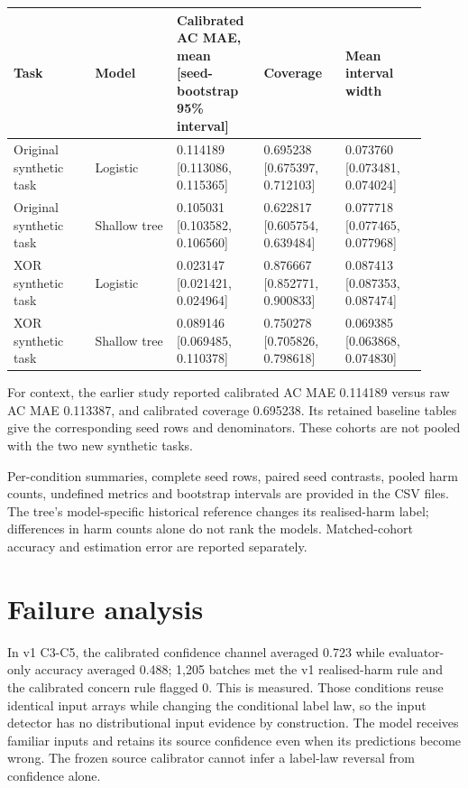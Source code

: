 \documentclass[11pt,a4paper]{article}
\begin{document}
\begingroup\scriptsize
\begin{longtable}{p{0.182\linewidth}p{0.182\linewidth}p{0.182\linewidth}p{0.182\linewidth}p{0.182\linewidth}}
\toprule
Task & Model & Calibrated AC MAE, mean [seed-bootstrap 95\% interval] & Coverage & Mean interval width \\
\midrule
Original synthetic task & Logistic & 0.114189 [0.113086, 0.115365] & 0.695238 [0.675397, 0.712103] & 0.073760 [0.073481, 0.074024] \\
Original synthetic task & Shallow tree & 0.105031 [0.103582, 0.106560] & 0.622817 [0.605754, 0.639484] & 0.077718 [0.077465, 0.077968] \\
XOR synthetic task & Logistic & 0.023147 [0.021421, 0.024964] & 0.876667 [0.852771, 0.900833] & 0.087413 [0.087353, 0.087474] \\
XOR synthetic task & Shallow tree & 0.089146 [0.069485, 0.110378] & 0.750278 [0.705826, 0.798618] & 0.069385 [0.063868, 0.074830] \\
\bottomrule
\end{longtable}
\endgroup

For context, the earlier study reported calibrated AC MAE 0.114189 versus raw AC MAE 0.113387, and calibrated coverage 0.695238. Its retained baseline tables give the corresponding seed rows and denominators. These cohorts are not pooled with the two new synthetic tasks.\par

Per-condition summaries, complete seed rows, paired seed contrasts, pooled harm counts, undefined metrics and bootstrap intervals are provided in the CSV files. The tree’s model-specific historical reference changes its realised-harm label; differences in harm counts alone do not rank the models. Matched-cohort accuracy and estimation error are reported separately.\par

\section{Failure analysis}

In v1 C3-C5, the calibrated confidence channel averaged 0.723 while evaluator-only accuracy averaged 0.488; 1,205 batches met the v1 realised-harm rule and the calibrated concern rule flagged 0. This is measured. Those conditions reuse identical input arrays while changing the conditional label law, so the input detector has no distributional input evidence by construction. The model receives familiar inputs and retains its source confidence even when its predictions become wrong. The frozen source calibrator cannot infer a label-law reversal from confidence alone.\par
\end{document}
